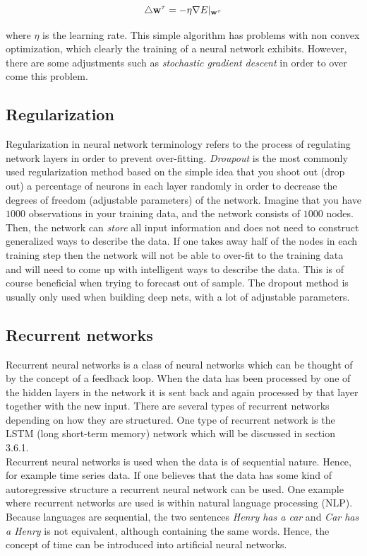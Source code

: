 \documentclass[12pt, letterpaper]{amsart}%
\begin{document}
\begin{equation}
\triangle \bold{w}^{\tau} = - \eta \nabla E \vert_{\bold{w}^{\tau}}
\end{equation}

where $\eta$ is the learning rate. This simple algorithm has problems with non convex optimization, which clearly the training of a neural network exhibits. However, there are some adjustments such as \textit{stochastic gradient descent} in order to over come this problem.

\subsection{Regularization}
Regularization in neural network terminology refers to the process of regulating network layers in order to prevent over-fitting. \textit{Droupout} is the most commonly used regularization method based on the simple idea that you shoot out (drop out) a percentage of neurons in each layer randomly in order to decrease the degrees of freedom (adjustable parameters) of the network. Imagine that you have $1000$ observations in your training data, and the network consists of $1000$ nodes. Then, the network can \textit{store} all input information and does not need to construct generalized ways to describe the data. If one takes away half of the nodes in each training step then the network will not be able to over-fit to the training data and will need to come up with intelligent ways to describe the data. This is of course beneficial when trying to forecast out of sample. The dropout method is usually only used when building deep nets, with a lot of adjustable parameters.

\subsection{Recurrent networks}
Recurrent neural networks is a class of neural networks which can be thought of by the concept of a feedback loop. When the data has been processed by one of the hidden layers in the network it is sent back and again processed by that layer together with the new input. There are several types of recurrent networks depending on how they are structured. One type of recurrent network is the LSTM (long short-term memory) network which will be discussed in section 3.6.1.
\\

Recurrent neural networks is used when the data is of sequential nature. Hence, for example time series data. If one believes that the data has some kind of autoregressive structure a recurrent neural network can be used. One example where recurrent networks are used is within natural language processing (NLP). Because languages are sequential, the two sentences \textit{Henry has a car} and \textit{Car has a Henry} is not equivalent, although containing the same words. Hence, the concept of time can be introduced into artificial neural networks.
\end{document}
